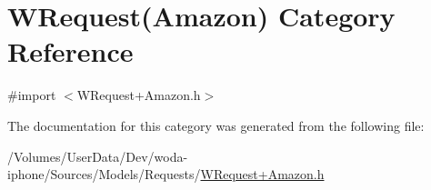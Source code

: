 \hypertarget{category_w_request_07_amazon_08}{\section{W\-Request(Amazon) Category Reference}
\label{category_w_request_07_amazon_08}
}


{\ttfamily \#import $<$W\-Request+\-Amazon.\-h$>$}



The documentation for this category was generated from the following file\-:\begin{DoxyCompactItemize}
\item 
/\-Volumes/\-User\-Data/\-Dev/woda-\/iphone/\-Sources/\-Models/\-Requests/\hyperlink{_w_request_09_amazon_8h}{W\-Request+\-Amazon.\-h}\end{DoxyCompactItemize}
